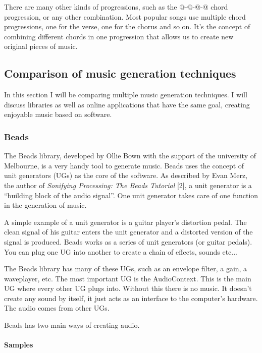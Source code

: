 \documentclass[12pt]{article}
\makeatletter
\newcommand*{\rom}[1]{\expandafter\@slowromancap\romannumeral #1@}
\makeatother
\begin{document}
There are many other kinds of progressions, such as the \rom{1}-\rom{2}-\rom{5}-\rom{1} chord progression, or any other combination. Most popular songs use multiple chord progressions, one for the verse, one for the chorus and so on. It's the concept of combining different chords in one progression that allows us to create new original pieces of music.
\newpage

\subsection{Comparison of music generation techniques}

In this section I will be comparing multiple music generation techniques. I will discuss libraries as well as online applications that have the same goal, creating enjoyable music based on software.

\subsubsection{Beads}
The Beads library, developed by Ollie Bown with the support of the university of Melbourne, is a very handy tool to generate music. Beads uses the concept of unit generators (UGs) as the core of the software. As described by Evan Merz, the author of \textit{Sonifying Processing: The Beads Tutorial} [2], a unit generator is a ``building block of the audio signal''.  One unit generator takes care of one function in the generation of music. 
\newline

A simple example of a unit generator is a guitar player's distortion pedal. The clean signal of his guitar enters the unit generator and a distorted version of the signal is produced. Beads works as a series of unit generators (or guitar pedals). You can plug one UG into another to create a chain of effects, sounds etc... 
\newline

The Beads library has many of these UGs, such as an envelope filter, a gain, a waveplayer, etc. The most important UG is the AudioContext. This is the main UG where every other UG plugs into. Without this there is no music. It doesn't create any sound by itself, it just acts as an interface to the computer's hardware. The audio comes from other UGs.
\newline

Beads has two main ways of creating audio.

\paragraph{Samples}
\end{document}
